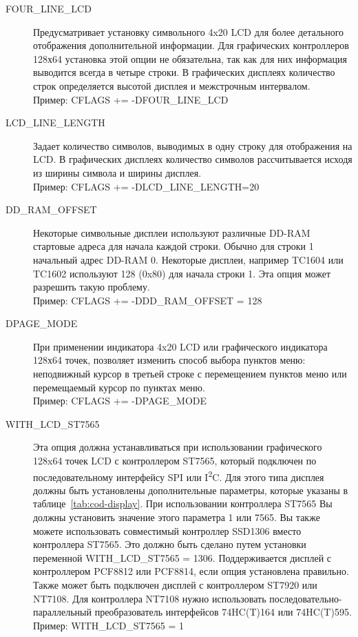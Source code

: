 \begin{description}
  \item[FOUR\_LINE\_LCD] Предусматривает установку символьного 4x20 LCD для более детального отображения 
дополнительной информации. Для графических контроллеров 128х64 установка этой опции не обязательна, так как
для них информация выводится всегда в четыре строки.
В графических дисплеях количество строк определяется высотой дисплея и межстрочным интервалом.\\
Пример: CFLAGS += -DFOUR\_LINE\_LCD

  \item[LCD\_LINE\_LENGTH] Задает количество символов, выводимых в одну строку для отображения на LCD.
В графических дисплеях количество символов рассчитывается исходя из ширины символа и ширины дисплея.\\
Пример: CFLAGS += -DLCD\_LINE\_LENGTH=20

  \item[DD\_RAM\_OFFSET] Некоторые символьные дисплеи используют различные DD-RAM стартовые адреса для начала каждой строки.
Обычно для строки 1 начальный адрес DD-RAM 0.
Некоторые дисплеи, например TC1604 или TC1602 используют 128 (0x80) для начала строки 1.
Эта опция может разрешить такую проблему. \\
Пример: CFLAGS += -DDD\_RAM\_OFFSET = 128

  \item[DPAGE\_MODE] При применении индикатора 4x20 LCD или графического индикатора 128х64 точек, позволяет 
изменить способ выбора пунктов меню: неподвижный курсор в третьей строке с перемещением пунктов меню или 
перемещаемый курсор по пунктах меню. \\
Пример: CFLAGS += -DPAGE\_MODE
 
  \item[WITH\_LCD\_ST7565] Эта опция должна устанавливаться при использовании графического 128x64 точек LCD с 
контроллером ST7565, который подключен по последовательному интерфейсу SPI или I\textsuperscript{2}C. Для этого типа дисплея должны быть 
установлены дополнительные параметры, которые указаны в таблице~\ref{tab:cod-display}.
При использовании контроллера ST7565 Вы должны установить значение этого параметра 1 или 7565. 
Вы также можете использовать совместимый контроллер SSD1306 вместо контроллера ST7565.
Это должно быть сделано путем установки переменной WITH\_LCD\_ST7565 = 1306.
Поддерживается дисплей с контроллером PCF8812 или PCF8814, если опция установлена правильно.
Также может быть подключен дисплей с контроллером ST7920 или NT7108.
Для контроллера NT7108 нужно использовать последовательно-параллельный преобразователь интерфейсов 
74HC(T)164 или 74HC(T)595. \\
Пример: WITH\_LCD\_ST7565 = 1


\end{description}
